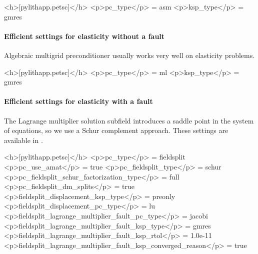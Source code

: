 \begin{cfg}
<h>[pylithapp.petsc]</h>
<p>pc_type</p> = asm
<p>ksp_type</p> = gmres
\end{cfg}

\paragraph{Efficient settings for elasticity without a fault}

Algebraic multigrid preconditioner usually works very well on
elasticity problems.

\begin{cfg}
<h>[pylithapp.petsc]</h>
<p>pc_type</p> = ml
<p>ksp_type</p> = gmres
\end{cfg}


\paragraph{Efficient settings for elasticity with a fault}

The Lagrange multiplier solution subfield introduces a saddle point in
the system of equations, so we use a Schur complement approach. These
settings are available in
.

\begin{cfg}
<h>[pylithapp.petsc]</h>
<p>pc_type</p> = fieldsplit
<p>pc_use_amat</p> = true
<p>pc_fieldsplit_type</p> = schur
<p>pc_fieldsplit_schur_factorization_type</p> = full
<p>pc_fieldsplit_dm_splits</p> = true
<p>fieldsplit_displacement_ksp_type</p> = preonly
<p>fieldsplit_displacement_pc_type</p> = lu
<p>fieldsplit_lagrange_multiplier_fault_pc_type</p> = jacobi
<p>fieldsplit_lagrange_multiplier_fault_ksp_type</p> = gmres
<p>fieldsplit_lagrange_multiplier_fault_ksp_rtol</p> = 1.0e-11
<p>fieldsplit_lagrange_multiplier_fault_ksp_converged_reason</p> = true
\end{cfg}



